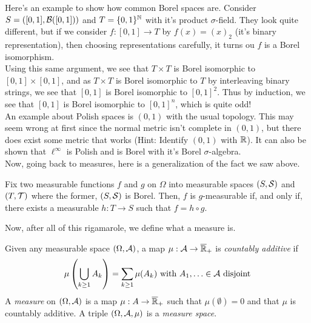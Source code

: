 Here's an example to show how common Borel spaces are. Consider $S = ([0, 1], \cal{B}([0, 1]))$ and $T = \{0, 1\}^{\N}$ with it's product $\sigma$-field. They look quite different, but if we consider $f : [0, 1] \to T$ by $f(x) = (x)_{2}$ (it's binary representation), then choosing representations carefully, it turns ou $f$ is a Borel isomorphism.\\

Using this same argument, we see that $T \times T$ is Borel isomorphic to $[0, 1] \times [0, 1]$, and as $T \times T$ is Borel isomorphic to $T$ by interleaving binary strings, we see that $[0, 1]$ is Borel isomorphic to $[0, 1]^{2}$. Thus by induction, we see that $[0, 1]$ is Borel isomorphic to $[0, 1]^{n}$, which is quite odd!\\

An example about Polish spaces is $(0, 1)$ with the usual topology. This may seem wrong at first since the normal metric isn't complete in $(0, 1)$, but there does exist some metric that works (Hint: Identify $(0, 1)$ with $\R$). It can also be shown that $\ell^{\infty}$ is Polish and is Borel with it's Borel $\sigma$-algebra.\\

Now, going back to measures, here is a generalization of the fact we saw above.

\begin{theorem}
    Fix two measurable functions $f$ and $g$ on $\Omega$ into measurable spaces $(S, \cal{S})$ and $(T, \cal{T})$ where the former, $(S, \cal{S})$ is Borel. Then, $f$ is $g$-measurable if, and only if, there exists a measurable $h : T \to S$ such that $f = h \circ g$. 
\end{theorem}

Now, after all of this rigamarole, we define what a measure is.

\begin{definition}
    Given any measurable space $(\Omega, \cal{A})$, a map $\mu : \cal{A} \to \overline{\R}_{+}$ is \emph{countably additive} if
    \[ \mu\left(\bigcup_{k \geq 1} A_{k}\right) = \sum_{k \geq 1} \mu(A_k) \text{ with } A_1, \ldots \in \cal{A} \text{ disjoint} \]
    A \emph{measure} on $(\Omega, \cal{A})$ is a map $\mu : A \to \overline{\R}_{+}$ such that $\mu(\emptyset) = 0$ and that $\mu$ is countably additive. A triple $(\Omega, \cal{A}, \mu)$ is a \emph{measure space}.
\end{definition}

